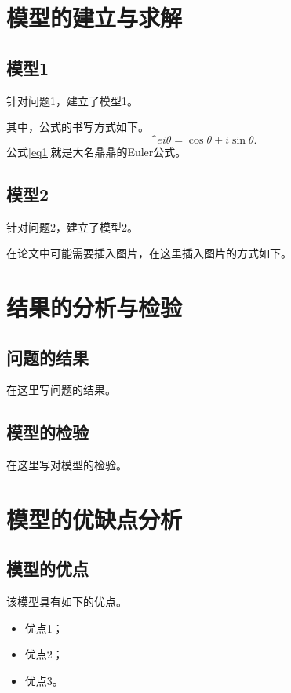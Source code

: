 \documentclass[12pt, a4paper, oneside, utf8]{ctexart}
\begin{document}
    \section{模型的建立与求解}


    \subsection{模型1}

    针对问题1，建立了模型1。

    其中，公式的书写方式如下。
    \begin{equation}
        \label{eq1}
        {\textrm{^}{e}}{i\theta}=\cos\theta+i\sin\theta.
    \end{equation}
    公式\ref{eq1}就是大名鼎鼎的Euler公式。

    \subsection{模型2}

    针对问题2，建立了模型2。

    在论文中可能需要插入图片，在这里插入图片的方式如下。

    \section{结果的分析与检验}

    \subsection{问题的结果}

    在这里写问题的结果。

    \subsection{模型的检验}

    在这里写对模型的检验。

    \section{模型的优缺点分析}

    \subsection{模型的优点}

    该模型具有如下的优点。
    \begin{itemize}
        \item 优点1；
        \item 优点2；
        \item 优点3。
    \end{itemize}
\end{document}
